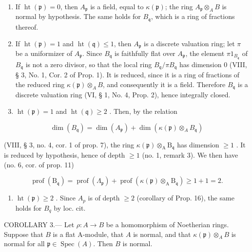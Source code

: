 \begin{enumerate}
\def\labelenumi{\arabic{enumi})}
\item
  If \(\operatorname{ht}(\mathfrak{p}) = 0\), then \(A_{\mathfrak{p}}\) is a field, equal to \(\kappa(\mathfrak{p})\); the ring \(A_{\mathfrak{p}} \otimes_{A} B\) is normal by hypothesis. The same holds for \(B_{\mathfrak{q}}\), which is a ring of fractions thereof.
\item
  If \(\operatorname{ht}(\mathfrak{p}) = 1\) and \(\operatorname{ht}(\mathfrak{q}) \leqslant 1\), then \(A_{\mathfrak{p}}\) is a discrete valuation ring; let \(\pi\) be a uniformizer of \(A_{\mathfrak{p}}\). Since \(B_{\mathfrak{q}}\) is faithfully flat over \(A_{\mathfrak{p}}\), the element \(\pi 1_{B_{\mathfrak{q}}}\) of \(B_{\mathfrak{q}}\) is not a zero divisor, so that the local ring \(B_{\mathfrak{q}}/\pi B_{\mathfrak{q}}\) has dimension 0 (VIII, § 3, No. 1, Cor. 2 of Prop. 1). It is reduced, since it is a ring of fractions of the reduced ring \(\kappa(\mathfrak{p}) \otimes_{A} B\), and consequently it is a field. Therefore \(B_{\mathfrak{q}}\) is a discrete valuation ring (VI, § 1, No. 4, Prop. 2), hence integrally closed.
\item
  \(\operatorname{ht}(\mathfrak{p}) = 1\) and \(\operatorname{ht}(\mathfrak{q}) \geqslant 2\) . Then, by the relation
\end{enumerate}

\[
\dim (B _ {\mathfrak {q}}) = \dim (A _ {\mathfrak {p}}) + \dim (\kappa (\mathfrak {p}) \otimes_ {A} B _ {\mathfrak {q}})
\]

(VIII, § 3, no. 4, cor. 1 of prop. 7), the ring \(\kappa(\mathfrak{p})\otimes_{\mathrm{A}}\mathrm{B}_{\mathfrak{q}}\) has dimension \(\geqslant 1\) . It is reduced by hypothesis, hence of depth \(\geqslant 1\) (no. 1, remark 3). We then have (no. 6, cor. of prop. 11)

\[
\operatorname{prof} \left(\mathrm{B} _ {\mathfrak {q}}\right) = \operatorname{prof} \left(\Lambda_ {\mathfrak {p}}\right) + \operatorname{prof} \left(\kappa (\mathfrak {p}) \otimes_ {\mathrm{A}} \mathrm{B} _ {\mathfrak {q}}\right) \geqslant 1 + 1 = 2.
\]

\begin{enumerate}
\def\labelenumi{\arabic{enumi})}
\setcounter{enumi}{3}
\tightlist
\item
  \(\operatorname{ht}(\mathfrak{p}) \geqslant 2\) . Since \(A_{p}\) is of depth \(\geqslant 2\) (corollary of Prop. 16), the same holds for \(B_{q}\) by loc. cit.
\end{enumerate}

COROLLARY 3.--- Let \(\rho: A \to B\) be a homomorphism of Noetherian rings. Suppose that \(B\) is a flat A-module, that \(A\) is normal, and that \(\kappa(\mathfrak{p}) \otimes_A B\) is normal for all \(\mathfrak{p} \in \operatorname{Spec}(A)\). Then \(B\) is normal.

